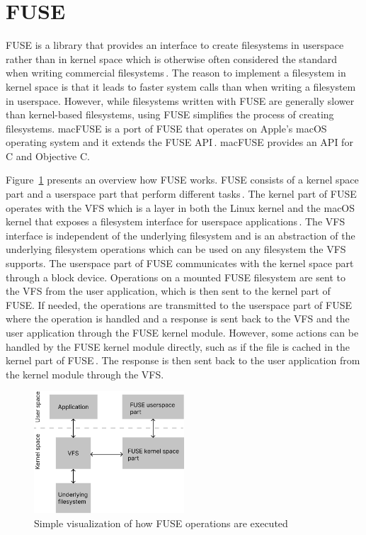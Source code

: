 \section{FUSE}
\gls{FUSE} is a library that provides an interface to create filesystems in userspace rather than in kernel space which is otherwise often considered the standard when writing commercial filesystems\,\cite{Libfuse2021}. The reason to implement a filesystem in kernel space is that it leads to faster system calls than when writing a filesystem in userspace. However, while filesystems written with \gls{FUSE} are generally slower than \mbox{kernel-based} filesystems, using \gls{FUSE} simplifies the process of creating filesystems. macFUSE is a port of \gls{FUSE} that operates on Apple's macOS operating system and it extends the \gls{FUSE} \gls{API}\,\cite{HomeMacFUSE}. macFUSE provides an \gls{API} for C and Objective C.

Figure~\ref{fig:fuse_desc} presents an overview how \gls{FUSE} works. \gls{FUSE} consists of a kernel space part and a userspace part that perform different tasks\,\cite{vangoorFUSENotFUSE2017}. The kernel part of \gls{FUSE} operates with the \gls{VFS} which is a layer in both the Linux kernel and the macOS kernel that exposes a filesystem interface for userspace applications\,\cite{goochOverviewLinuxVirtual, singhMacOSInternals2006}. The \gls{VFS} interface is independent of the underlying filesystem and is an abstraction of the underlying filesystem operations which can be used on any filesystem the \gls{VFS} supports. The userspace part of \gls{FUSE} communicates with the kernel space part through a block device. Operations on a mounted \gls{FUSE} filesystem are sent to the \gls{VFS} from the user application, which is then sent to the kernel part of \gls{FUSE}. If needed, the operations are transmitted to the userspace part of \gls{FUSE} where the operation is handled and a response is sent back to the \gls{VFS} and the user application through the \gls{FUSE} kernel module. However, some actions can be handled by the \gls{FUSE} kernel module directly, such as if the file is cached in the kernel part of \gls{FUSE}\,\cite{vangoorFUSENotFUSE2017}. The response is then sent back to the user application from the kernel module through the \gls{VFS}.

\begin{figure}[!ht]
	\begin{center}
	  \includegraphics[width=0.5\textwidth]{figures/fuse_description.png}
	\end{center}
	\caption{Simple visualization of how \gls{FUSE} operations are executed}
	\label{fig:fuse_desc}
\end{figure}